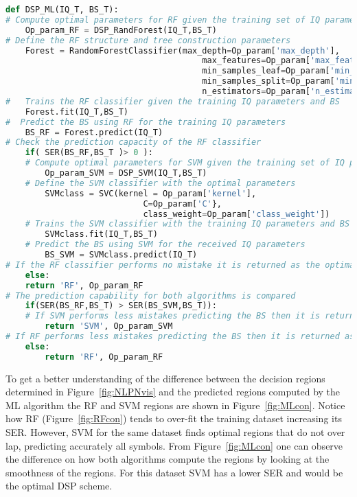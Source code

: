 \begin{lstlisting}[language=Python,caption=Machine learning enabled DSP scheme that  returns the best performing ML algorithm and the optimal parameter for the training algorithm. ,label=lis:MLDSP]
def DSP_ML(IQ_T, BS_T):
# Compute optimal parameters for RF given the training set of IQ parameters
	Op_param_RF = DSP_RandForest(IQ_T,BS_T)
# Define the RF structure and tree construction parameters
	Forest = RandomForestClassifier(max_depth=Op_param['max_depth'],
										max_features=Op_param['max_features'],
										min_samples_leaf=Op_param['min_samples_leaf'],
										min_samples_split=Op_param['min_samples_split'],
										n_estimators=Op_param['n_estimators'])
#	Trains the RF classifier given the training IQ parameters and BS
	Forest.fit(IQ_T,BS_T)
#  Predict the BS using RF for the training IQ parameters
	BS_RF = Forest.predict(IQ_T)
# Check the prediction capacity of the RF classifier 
	if( SER(BS_RF,BS_T )> 0 ):
	# Compute optimal parameters for SVM given the training set of IQ parameters and BS
		Op_param_SVM = DSP_SVM(IQ_T,BS_T)
	# Define the SVM classifier with the optimal parameters 
		SVMclass = SVC(kernel = Op_param['kernel'],
							C=Op_param['C'},
							class_weight=Op_param['class_weight'])
	# Trains the SVM classifier with the training IQ parameters and BS      
		SVMclass.fit(IQ_T,BS_T)
	# Predict the BS using SVM for the received IQ parameters
		BS_SVM = SVMclass.predict(IQ_T)
# If the RF classifier performs no mistake it is returned as the optimal classifier
	else:
   	return 'RF', Op_param_RF
# The prediction capability for both algorithms is compared 
	if(SER(BS_RF,BS_T) > SER(BS_SVM,BS_T)):
	# If SVM performs less mistakes predicting the BS then it is returned as the optimal classifier
		return 'SVM', Op_param_SVM
# If RF performs less mistakes predicting the BS then it is returned as the optimal classifier
	else:
		return 'RF', Op_param_RF
\end{lstlisting}	

To get a better understanding of the difference between the decision regions determined in Figure~\ref{fig:NLPNvis} and the predicted regions computed by the ML algorithm the RF and SVM regions are shown in Figure~\ref{fig:MLcon}. Notice how RF (Figure~\ref{fig:RFcon}) tends to over-fit the training dataset increasing its SER. However, SVM for the same dataset finds optimal regions that do not over lap, predicting accurately all symbols. From Figure~\ref{fig:MLcon} one can observe the difference on how both algorithms compute the regions by looking at the smoothness of the regions. For this dataset SVM has a lower SER and would  be the optimal DSP scheme.

